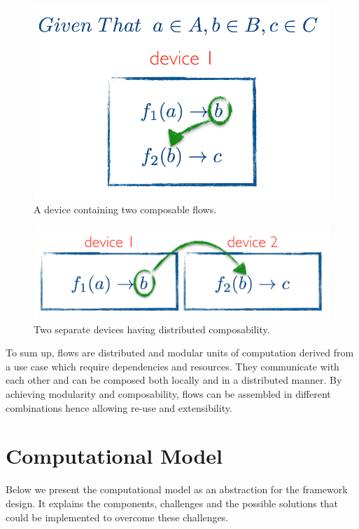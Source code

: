 \begin{figure}[H]
	\centering
	\includegraphics[scale=0.5]{images/local-compose.png} 
 	\caption{A device containing two composable flows.}
	\label{fig:compose}
\end{figure}
\begin{figure}[H]
	\centering
	\includegraphics[scale=0.5]{images/distributed-compose.png}
	\caption{Two separate devices having distributed composability.}
	\label{fig:compose2}
\end{figure}

\noindent To sum up, flows are distributed and modular units of computation derived from a use case which require dependencies and resources. They communicate with each other and can be composed both locally and in a distributed manner. By achieving  modularity and composability, flows can be assembled in different combinations hence allowing re-use and extensibility.
\newpage
\section{Computational Model}

Below we present the computational model as an abstraction for the framework design. It explains the components, challenges and the possible solutions that could be implemented to overcome these challenges. 	

